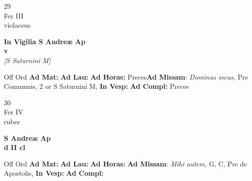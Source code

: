 \documentclass[10pt, openany]{book}
\begin{document}
        \begin{center}
            \begin{minipage}{3.5in}
                \vspace{2em}
                \begin{minipage}{0.5in}
                    {\Huge 29} \\
                    {\normalsize Fer III} \\
                    {\normalsize violaceus}
                \end{minipage}
                \begin{minipage}{3.0in}
                    \textbf{ \large In Vigilia S Andreæ Ap \\
                    \textnormal{\normalsize v}} \\ \textit{[S Saturnini M]} \\ 
                \end{minipage}
                \begin{justify}Off Ord
                    \textbf{Ad Mat: }
                    \textbf{Ad Lau: }
                    \textbf{Ad Horas: }Preces\textbf{Ad Missam}: \textit{Dominus secus,} Pre Communis, 2 or S Saturnini M,  
                    \textbf{In Vesp: }
                    \textbf{Ad Compl: }Preces
                \end{justify}
            \end{minipage}
        \end{center}
    
        \begin{center}
            \begin{minipage}{3.5in}
                \vspace{2em}
                \begin{minipage}{0.5in}
                    {\Huge 30} \\
                    {\normalsize Fer IV} \\
                    {\normalsize ruber}
                \end{minipage}
                \begin{minipage}{3.0in}
                    \textbf{ \large S Andreæ Ap \\
                    \textnormal{\normalsize d II cl}} \\ 
                \end{minipage}
                \begin{justify}Off Ord
                    \textbf{Ad Mat: }
                    \textbf{Ad Lau: }
                    \textbf{Ad Horas: }\textbf{Ad Missam}: \textit{Mihi autem,} G, C, Pre de Apostolis,  
                    \textbf{In Vesp: }
                    \textbf{Ad Compl: }
                \end{justify}
            \end{minipage}
        \end{center}
    
\end{document}
